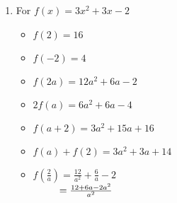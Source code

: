 \begin{enumerate}
\begin{multicols}{3}
\begin{itemize}
\end{itemize}
\end{multicols}

\begin{multicols}{3}
\begin{itemize}

\item  $f \left( \frac{2}{a} \right) = \frac{8}{a^2} - 1$ \\
$\hphantom{f \left( \frac{2}{a} \right)} = \frac{8-a^2}{a^2}$

\vfill

\columnbreak

\item $\frac{f(a)}{2} =  \frac{2a^2-1}{2}$

\vfill

\columnbreak


\item  $f(a + h) = 2a^2+4ah+2h^2-1$

\end{itemize}
\end{multicols}



\item For $f(x) = 3x^2+3x-2$

\begin{multicols}{3}
\begin{itemize}

\item  $f(2) = 16$
\item  $f(-2) = 4$
\item  $f(2a) = 12a^2+6a-2$

\end{itemize}
\end{multicols}

\begin{multicols}{3}
\begin{itemize}

\item  $2 f(a) = 6a^2+6a-4$
\item $f(a+2) = 3a^2+15a+16$
\item \small $f(a) + f(2) = 3a^2+3a+14$ \normalsize

\end{itemize}
\end{multicols}

\begin{multicols}{3}
\begin{itemize}

\item  $f \left( \frac{2}{a} \right) = \frac{12}{a^2} + \frac{6}{a} - 2$ \\
$\hphantom{f \left( \frac{2}{a} \right)} = \frac{12+6a-2a^2}{a^2}$


\end{itemize}
\end{multicols}
\end{enumerate}
